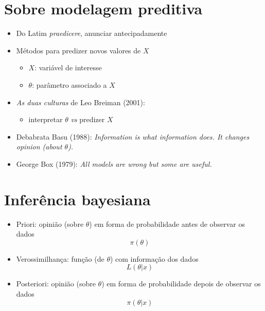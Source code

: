 \documentclass{beamer}\usepackage[]{graphicx}\usepackage[]{xcolor}
\begin{document}
\section{Sobre modelagem preditiva}
\begin{frame}{\secname}
    \begin{itemize}
    \item Do Latim \textit{praedicere}, anunciar antecipadamente
    \pause
    \item Métodos para predizer novos valores de $X$
      \begin{itemize}
      \item $X$: variável de interesse
      \item $\theta$: parâmetro associado a $X$
      \end{itemize}
    \pause
    \item \textit{As duas culturas} de Leo Breiman (2001):
      \begin{itemize}
      \item interpretar $\theta$ \textit{vs} predizer $X$
      \end{itemize}
    \pause
    \item Debabrata Basu (1988): \textit{Information is what information does. It changes opinion (about $\theta$).}
    \pause
    \item George Box (1979): \textit{All models are wrong but some are useful.}
    \end{itemize}
\end{frame}


\section{Inferência bayesiana}
\begin{frame}{\secname}
    \begin{itemize}
    \item Priori: opinião (sobre $\theta$) em forma de probabilidade antes de observar os dados \[ \pi(\theta) \]
    \pause
    \item Verossimilhança: função (de $\theta$) com informação dos dados \[ L(\theta|x) \]
    \pause
    \item Posteriori: opinião (sobre $\theta$) em forma de probabilidade depois de observar os dados \[ \pi(\theta|x) \]
    \end{itemize}
\end{frame}
\end{document}

